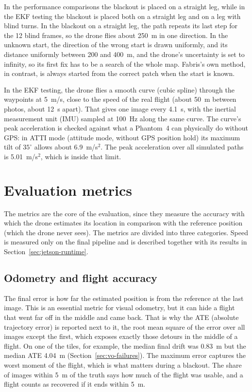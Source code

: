 \documentclass[english, Lau, oneside]{sapthesis}%
\begin{document}
In the performance comparisons the blackout is placed on a straight leg, while in the EKF testing the blackout is placed both on a straight leg and on a leg with blind turns. In the blackout on a straight leg, the path repeats its last step for the 12 blind frames, so the drone flies about 250~m in one direction. In the unknown start, the direction of the wrong start is drawn uniformly, and its distance uniformly between 200 and 400~m, and the drone's uncertainty is set to infinity, so its first fix has to be a search of the whole map. Fabris's own method, in contrast, is always started from the correct patch when the start is known.

In the EKF testing, the drone flies a smooth curve (cubic spline) through the waypoints at 5~m/s, close to the speed of the real flight (about 50~m between photos, about 12~s apart). That gives one image every 4.1~s, with the inertial measurement unit (IMU) sampled at 100~Hz along the same curve. The curve's peak acceleration is checked against what a Phantom~4 can physically do without GPS: in ATTI mode (attitude mode, without GPS position hold) its maximum tilt of $35^\circ$ \citep{dji2016phantom4} allows about 6.9~m/s$^2$. The peak acceleration over all simulated paths is 5.01~m/s$^2$, which is inside that limit.

\section{Evaluation metrics}
\label{sec:metrics}
The metrics are the core of the evaluation, since they measure the accuracy with which the drone estimates its location in comparison with the reference position (which the drone never sees). The metrics are divided into three categories. Speed is measured only on the final pipeline and is described together with its results in Section~\ref{sec:jetson-runtime}.

\subsection{Odometry and flight accuracy}
\label{sec:metrics-odometry}
The final error is how far the estimated position is from the reference at the last image. This is an essential metric for visual odometry, but it can hide a flight that went far off in the middle and came back. That is why the ATE (absolute trajectory error) is reported next to it, the root mean square of the error over all images except the first, which exposes exactly those detours in the middle of a flight. On one of the tiles, for example, the median final drift was 0.83~m but the median ATE 4.04~m (Section~\ref{sec:vo-failures}). The maximum error captures the worst moment of the flight, which is what matters during a blackout. The share of images within 5~m of the truth says how much of the flight was usable, and a flight counts as recovered if it ends within 5~m.
\end{document}
